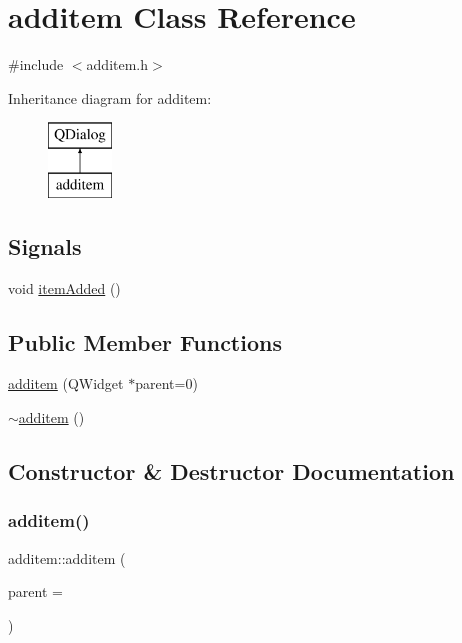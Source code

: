 \hypertarget{classadditem}{}\section{additem Class Reference}
\label{classadditem}


{\ttfamily \#include $<$additem.\+h$>$}

Inheritance diagram for additem\+:\begin{figure}[H]
\begin{center}
\leavevmode
\includegraphics[height=2.000000cm]{classadditem}
\end{center}
\end{figure}
\subsection*{Signals}
\begin{DoxyCompactItemize}
\item 
void \hyperlink{classadditem_aebf196dafb07560ccaae7e5a45765db3}{item\+Added} ()
\end{DoxyCompactItemize}
\subsection*{Public Member Functions}
\begin{DoxyCompactItemize}
\item 
\hyperlink{classadditem_a64cdfddc10867c6a2c3cdd8be854e049}{additem} (Q\+Widget $\ast$parent=0)
\item 
\hyperlink{classadditem_ada0331b13159bc5c2077a897ebc759b4}{$\sim$additem} ()
\end{DoxyCompactItemize}


\subsection{Constructor \& Destructor Documentation}
\mbox{\label{classadditem_a64cdfddc10867c6a2c3cdd8be854e049}} 
\subsubsection{\texorpdfstring{additem()}{additem()}}
{\footnotesize\ttfamily additem\+::additem (\begin{DoxyParamCaption}\item[{Q\+Widget $\ast$}]{parent = {} }\end{DoxyParamCaption})\hspace{0.3cm}{\ttfamily [explicit]}}

